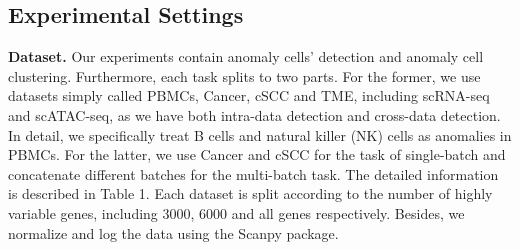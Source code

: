 \documentclass{article}
\begin{document}
\begin{table}
    \centering
    \caption{Average F1*NMI score with standard deviation for fine-grained anomaly detection on single-cell transcriptomics datasets.}
    \label{tab:plain}
\end{table}
\subsection{Experimental Settings}
\textbf{Dataset.}	Our experiments contain anomaly cells’ detection and anomaly cell 
clustering. Furthermore, each task splits to two parts. For the former, we use datasets 
simply called PBMCs, Cancer, cSCC and TME, including scRNA-seq and scATAC-seq, as we have both 
intra-data detection and cross-data detection. In detail, we specifically treat B cells 
and natural killer (NK) cells as anomalies in PBMCs. For the latter, we use Cancer and cSCC for 
the task of single-batch and concatenate different batches for the multi-batch task. The 
detailed information is described in Table 1. Each dataset is split according to the 
number of highly variable genes, including 3000, 6000 and all genes respectively. Besides, 
we normalize and log the data using the Scanpy \cite{scanpy} package.
\end{document}
